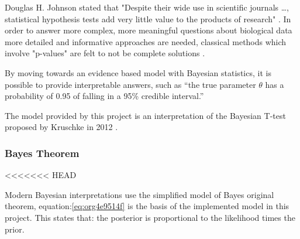 \documentclass[11pt]{report}
\begin{document}
Douglas H. Johnson stated that "Despite their wide use in scientific journals \ldots{}, statistical  hypothesis tests add very little value to the products of research" \cite{Johnson1999a}. In order to answer more complex, more meaningful questions about biological data more detailed and informative approaches are needed, classical methods which involve "p-values" are felt to not be complete solutions \cite{Goodman1999}.

By moving towards an evidence based model with Bayesian statistics, it is possible to provide interpretable answers, such as “the true parameter \(\theta\) has a probability of 0.95 of falling in a 95\% credible interval.”

The model provided by this project is an interpretation of the Bayesian T-test proposed by Kruschke in 2012 \cite{Kruschke2012}.

\subsubsection{Bayes Theorem}
<<<<<<< HEAD
\label{sec:org2d13792}

Modern Bayesian interpretations use the simplified model of Bayes original theorem, equation:\ref{eq:org4e9514f} is the basis of the implemented model in this project. This states that: the posterior is proportional to the likelihood times the prior.
\end{document}
